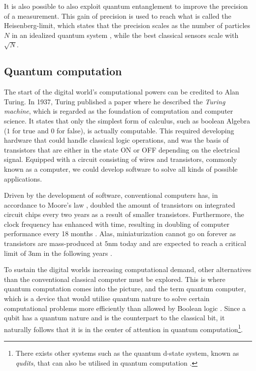 It is also possible to also exploit quantum entanglement to improve the precision of a measurement. This gain of precision is used to reach what is called the Heisenberg-limit, which states that the precision scales as the number of particles $N$ in an idealized quantum system \cite{Degen2017, Acin2018}, while the best classical sensors scale with $\sqrt{N}$.

\subsection{Quantum computation}
The start of the digital world's computational powers can be credited to Alan Turing. In 1937, Turing \cite{Turing1937} published a paper where he described the \textit{Turing machine}, which is regarded as the foundation of computation and computer science. It states that only the simplest form of calculus, such as boolean Algebra ($1$ for true and $0$ for false), is actually computable. This required developing hardware that could handle classical logic operations, and was the basis of transistors that are either in the state ON or OFF depending on the electrical signal. Equipped with a circuit consisting of wires and transistors, commonly known as a computer, we could develop software to solve all kinds of possible applications.

Driven by the development of software, conventional computers has, in accordance to Moore's law \cite{Moore1965}, doubled the amount of transistors on integrated circuit chips every two years as a result of smaller transistors. Furthermore, the clock frequency has enhanced with time, resulting in doubling of computer performance every 18 months \cite{Pavicic2006}. Alas, miniaturization cannot go on forever as transistors are mass-produced at $5$nm today and are expected to reach a critical limit of $3$nm in the following years \cite{Gwennap2020}.

To sustain the digital worlds increasing computational demand, other alternatives than the conventional classical computer must be explored. This is where quantum computation comes into the picture, and the term quantum computer, which is a device that would utilise quantum nature to solve certain computational problems more efficiently than allowed by Boolean logic \cite{Weber2010}. Since a qubit has a quantum nature and is the counterpart to the classical bit, it naturally follows that it is in the center of attention in quantum computation\footnote{There exists other systems such as the quantum d-state system, known as \textit{qudits}, that can also be utilised in quantum computation \cite{Ladd2010}.}.

